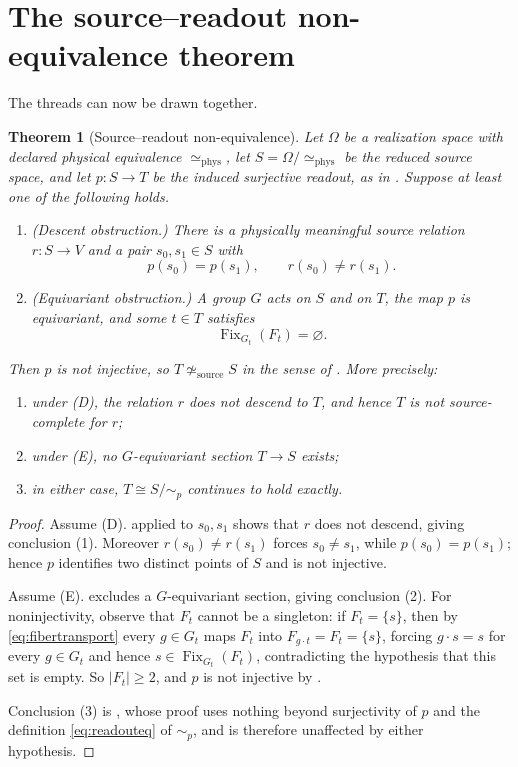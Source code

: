 \documentclass[11pt,reqno]{amsart}
\theoremstyle{plain}
\newtheorem{theorem}{Theorem}[section]
\theoremstyle{definition}
\theoremstyle{remark}
\DeclareMathOperator{\Fix}{Fix}
\newcommand{\phe}{\simeq_{\mathrm{phys}}}
\newcommand{\Om}{\Omega}
\begin{document}
\section{The source--readout non-equivalence theorem}
\label{sec:combined}

The threads can now be drawn together.

\begin{theorem}[Source--readout non-equivalence]
\label{thm:combined}
Let $\Om$ be a realization space with declared physical equivalence $\phe$, let $S=\Om/\!\phe$ be the reduced source space, and let $p\colon S\to T$ be the induced surjective readout, as in . Suppose at least one of the following holds.
\begin{enumerate}
\item[\textup{(D)}]\label{it:D} \emph{(Descent obstruction.)} There is a physically meaningful source relation $r\colon S\to V$ and a pair $s_{0},s_{1}\in S$ with
\[
p(s_{0})=p(s_{1}),
\qquad
r(s_{0})\neq r(s_{1}).
\]
\item[\textup{(E)}]\label{it:E} \emph{(Equivariant obstruction.)} A group $G$ acts on $S$ and on $T$, the map $p$ is equivariant, and some $t\in T$ satisfies
\[
\Fix_{G_{t}}(F_{t})=\varnothing.
\]
\end{enumerate}
Then $p$ is not injective, so $T\not\simeq_{\mathrm{source}}S$ in the sense of . More precisely:
\begin{enumerate}
\item under \textup{(D)}, the relation $r$ does not descend to $T$, and hence $T$ is not source-complete for $r$;
\item under \textup{(E)}, no $G$-equivariant section $T\to S$ exists;
\item in either case, $T\cong S/\!\sim_{p}$ continues to hold exactly.
\end{enumerate}
\end{theorem}

\begin{proof}
Assume (D).  applied to $s_{0},s_{1}$ shows that $r$ does not descend, giving conclusion (1). Moreover $r(s_{0})\neq r(s_{1})$ forces $s_{0}\neq s_{1}$, while $p(s_{0})=p(s_{1})$; hence $p$ identifies two distinct points of $S$ and is not injective.

Assume (E).  excludes a $G$-equivariant section, giving conclusion (2). For noninjectivity, observe that $F_{t}$ cannot be a singleton: if $F_{t}=\{s\}$, then by \eqref{eq:fibertransport} every $g\in G_{t}$ maps $F_{t}$ into $F_{g \cdot t} = F_{t}=\{s\}$, forcing $g\cdot s=s$ for every $g\in G_{t}$ and hence $s\in\Fix_{G_{t}}(F_{t})$, contradicting the hypothesis that this set is empty. So $|F_{t}|\geq 2$, and $p$ is not injective by .

Conclusion (3) is , whose proof uses nothing beyond surjectivity of $p$ and the definition \eqref{eq:readouteq} of $\sim_{p}$, and is therefore unaffected by either hypothesis.
\end{proof}
\end{document}
